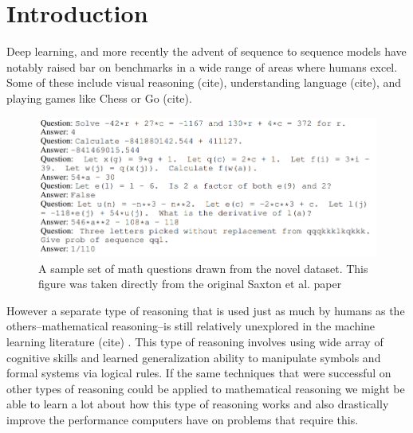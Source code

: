 










\section{Introduction}

Deep learning, and more recently the advent of sequence to sequence models have notably raised bar on benchmarks in a wide range of 
areas where humans excel. Some of these include visual reasoning (cite), understanding language (cite), and playing games like Chess or Go (cite). \\ 

\begin{figure}[hbt!]
\includegraphics[width=12cm]{images/math_examples_bunch.PNG}
\centering
\caption{A sample set of math questions drawn from the novel dataset. This figure was taken directly from the original Saxton et al. paper \supercite{DBLP:journals/corr/abs-1904-01557}}
\label{fig:mathexamples}
\end{figure}

However a separate type of reasoning that is used just as much by humans as the others--mathematical reasoning--is still relatively unexplored in the machine learning literature (cite) . This type of reasoning involves using  wide array of cognitive skills and learned generalization ability to manipulate symbols and formal systems via logical rules. If the same techniques that were successful on other types of reasoning could be applied to mathematical reasoning we might be able to learn a lot about how this type of reasoning works and also drastically improve the performance computers have on problems that require this. \\ 

